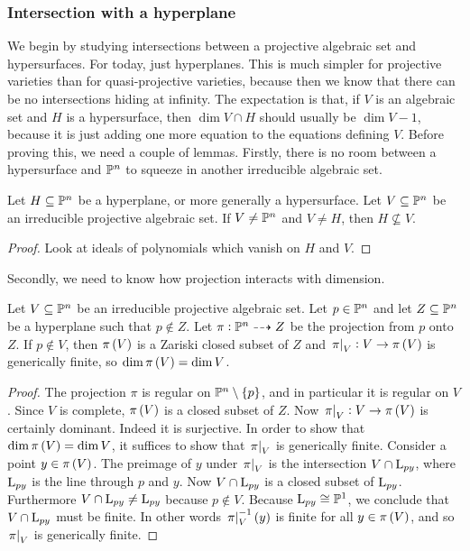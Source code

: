 \subsubsection{Intersection with a hyperplane}

We begin by studying intersections between a projective algebraic set and hypersurfaces. For today, just hyperplanes. This is much simpler for projective varieties than for quasi-projective varieties, because then we know that there can be no intersections hiding at infinity. The expectation is that, if $ V $ is an algebraic set and $ H $ is a hypersurface, then $ \dim V \cap H $ should usually be $ \dim V - 1 $, because it is just adding one more equation to the equations defining $ V $. Before proving this, we need a couple of lemmas. Firstly, there is no room between a hypersurface and $ \mathbb{P}^n $ to squeeze in another irreducible algebraic set.

\begin{lemma}
\label{lem:hypersurfaceirreducible}
Let $ H \subseteq \mathbb{P}^n $ be a hyperplane, or more generally a hypersurface. Let $ V \subseteq \mathbb{P}^n $ be an irreducible projective algebraic set. If $ V \ne \mathbb{P}^n $ and $ V \ne H $, then $ H \not\subseteq V $.
\end{lemma}

\begin{proof}
Look at ideals of polynomials which vanish on $ H $ and $ V $.
\end{proof}

Secondly, we need to know how projection interacts with dimension.

\begin{lemma}
\label{lem:projectiondimension}
Let $ V \subseteq \mathbb{P}^n $ be an irreducible projective algebraic set. Let $ p \in \mathbb{P}^n $ and let $ Z \subseteq \mathbb{P}^n $ be a hyperplane such that $ p \notin Z $. Let $ \pi : \mathbb{P}^n \dashrightarrow Z $ be the projection from $ p $ onto $ Z $. If $ p \notin V $, then $ \pi\br{V} $ is a Zariski closed subset of $ Z $ and $ \eval{\pi}_V : V \to \pi\br{V} $ is generically finite, so $ \dim \pi\br{V} = \dim V $.
\end{lemma}

\begin{proof}
The projection $ \pi $ is regular on $ \PP^n \setminus \cbr{p} $, and in particular it is regular on $ V $. Since $ V $ is complete, $ \pi\br{V} $ is a closed subset of $ Z $. Now $ \eval{\pi}_V : V \to \pi\br{V} $ is certainly dominant. Indeed it is surjective. In order to show that $ \dim \pi\br{V} = \dim V $, it suffices to show that $ \left. \pi \right|_V $ is generically finite. Consider a point $ y \in \pi\br{V} $. The preimage of $ y $ under $ \left. \pi \right|_V $ is the intersection $ V \cap \mathrm{L}_{py} $, where $ \mathrm{L}_{py} $ is the line through $ p $ and $ y $. Now $ V \cap \mathrm{L}_{py} $ is a closed subset of $ \mathrm{L}_{py} $. Furthermore $ V \cap \mathrm{L}_{py} \ne \mathrm{L}_{py} $ because $ p \notin V $. Because $ \mathrm{L}_{py} \cong \mathbb{P}^1 $, we conclude that $ V \cap \mathrm{L}_{py} $ must be finite. In other words $ \eval{\pi}_V^{-1}\br{y} $ is finite for all $ y \in \pi\br{V} $, and so $ \left. \pi \right|_V $ is generically finite.
\end{proof}

